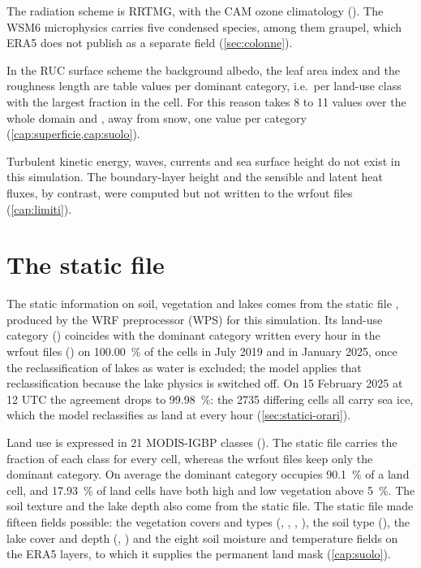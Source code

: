 The radiation scheme is RRTMG, with the CAM ozone climatology (). The WSM6
microphysics carries five condensed species, among them graupel, which ERA5 does not publish as a
separate field (\cref{sec:colonne}).

In the RUC surface scheme the background albedo, the leaf area index and the roughness length are
table values per dominant category, i.e.\ per land-use class with the largest fraction in the
cell. For this reason  takes 8 to 11 values over the whole domain and , away
from snow, one value per category (\cref{cap:superficie,cap:suolo}).

Turbulent kinetic energy, waves, currents and sea surface height do not exist in this simulation.
The boundary-layer height and the sensible and latent heat fluxes, by contrast, were computed but
not written to the wrfout files (\cref{cap:limiti}).

\section{The static file}
\label{sec:file-statico}

The static information on soil, vegetation and lakes comes from the static file
, produced by the WRF preprocessor (WPS) for this simulation. Its land-use
category () coincides with the dominant category written every hour in the wrfout
files () on \SI{100.00}{\percent} of the cells in July 2019 and in January 2025, once
the reclassification of lakes as water is excluded; the model applies that reclassification
because the lake physics is switched off. On 15 February 2025 at 12 UTC the agreement drops to
\SI{99.98}{\percent}: the \num{2735} differing cells all carry sea ice, which the model
reclassifies as land at every hour (\cref{sec:statici-orari}).

Land use is expressed in 21 MODIS-IGBP classes (). The
static file carries the fraction of each class for every cell, whereas the wrfout files keep only
the dominant category. On average the dominant category occupies \SI{90.1}{\percent} of a land
cell, and \SI{17.93}{\percent} of land cells have both high and low vegetation above
\SI{5}{\percent}. The soil texture and the lake depth also come from the static file. The static
file made fifteen fields possible: the vegetation covers and types (, ,
, ), the soil type (), the lake cover and depth (,
) and the eight soil moisture and temperature fields on the ERA5 layers, to which it
supplies the permanent land mask (\cref{cap:suolo}).
